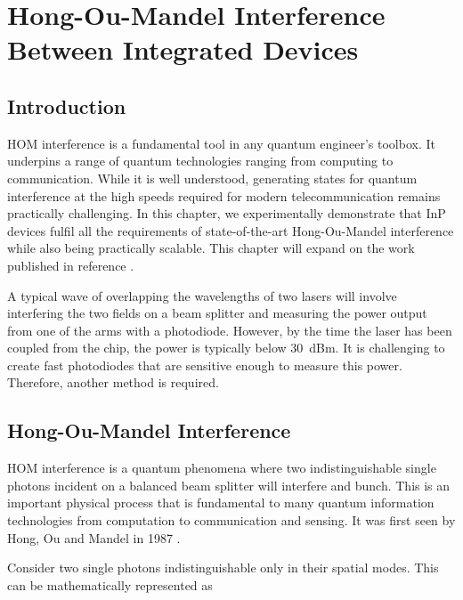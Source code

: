 %
\graphicspath{{./chapters/chapter03/fig03/}}

\let\textcircled=\pgftextcircled
\chapter[HOM Interference Between Integrated Devices]{Hong-Ou-Mandel Interference Between Integrated Devices}
\label{chap:hom}

\section{Introduction}

\ac{HOM} interference is a fundamental tool in any quantum engineer's toolbox. It underpins a range of quantum technologies ranging from computing to communication. While it is well understood, generating states for quantum interference at the high speeds required for modern telecommunication remains practically challenging. In this chapter, we experimentally demonstrate that \ac{InP} devices fulfil all the requirements of state-of-the-art Hong-Ou-Mandel interference while also being practically scalable. This chapter will expand on the work published in reference \cite{semenenko2019}. 

A typical wave of overlapping the wavelengths of two lasers will involve interfering the two fields on a beam splitter and measuring the power output from one of the arms with a photodiode. However, by the time the laser has been coupled from the chip, the power is typically below \SI{30}{dBm}. It is challenging to create fast photodiodes that are sensitive enough to measure this power. Therefore, another method is required.

\section{Hong-Ou-Mandel Interference}

\Ac{HOM} interference is a quantum phenomena where two indistinguishable single photons incident on a balanced beam splitter will interfere and bunch. This is an important physical process that is fundamental to many quantum information technologies from computation to communication and sensing. It was first seen by Hong, Ou and Mandel in 1987 \cite{HOM}. 

Consider two single photons indistinguishable only in their spatial modes. This can be mathematically represented as 

